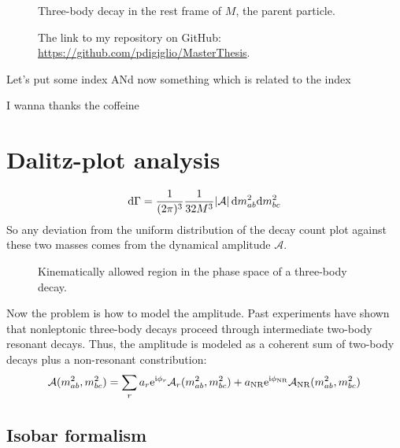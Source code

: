 \documentclass[
	fontsize=10pt,
	open=right,
	twoside,
    english,
    draft,
]{scrbook}
\newcommand{\A}{\ensuremath{\mathcal{A}}}
\begin{document}
\begin{figure}
    \centering

    \caption{Three-body decay in the rest frame of $M$, the parent particle.}
\end{figure}



\begin{figure}
	\centering
\caption{The link to my repository on GitHub: \url{https://github.com/pdigiglio/MasterThesis}.}
\end{figure}


Let's put some index
ANd now something which is related to the index






I wanna thanks the coffeine
%

\chapter{Dalitz-plot analysis}

\begin{equation}
    \ud\Gamma = \frac{1}{(2\pi)^3}\frac{1}{32M^3}\abs{\A}\ud m_{ab}^2 \!\ud m_{bc}^2
\end{equation}
So any deviation from the uniform distribution of the decay count plot against these two masses comes from the dynamical amplitude \A{}.

\begin{figure}
    \centering
%
    \caption{Kinematically allowed region in the phase space of a three-body decay.}
\end{figure}


Now the problem is how to model the amplitude.
Past experiments have shown that nonleptonic three-body decays proceed through intermediate two-body resonant decays.
Thus, the amplitude is modeled as a coherent sum of two-body decays plus a non-resonant constribution:
\begin{equation}
    \A(m_{ab}^2, m_{bc}^2) = \sum_r a_r \eu^{\iu\phi_r}\A_r(m_{ab}^2,m_{bc}^2)
    + a_{\textup{NR}} \eu^{\iu \phi_{\textup{NR}}} \A_{\textup{NR}}(m_{ab}^2,m_{bc}^2)
\end{equation}

\section{Isobar formalism}
\end{document}
